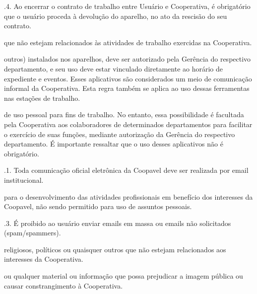 \documentclass[letterpaper,10pt,portuges]{sphinxmanual}
\begin{document}
.4. Ao encerrar o contrato de trabalho entre Usuário e Cooperativa, é obrigatório que o usuário proceda à devolução
do aparelho, no ato da rescisão do seu contrato.
\begin{description}
\sphinxAtStartPar
que não estejam relacionados às atividades de trabalho exercidas na Cooperativa.

\sphinxAtStartPar
outros) instalados nos aparelhos, deve ser autorizado pela Gerência do respectivo departamento, e seu uso deve estar
vinculado diretamente ao horário de expediente e eventos. Esses aplicativos são considerados um meio de comunicação
informal da Cooperativa. Esta regra também se aplica ao uso dessas ferramentas nas estações de trabalho.

\sphinxAtStartPar
de uso pessoal para fins de trabalho. No entanto, essa possibilidade é facultada pela Cooperativa aos colaboradores de determinados departamentos para facilitar o exercício de suas funções, mediante autorização da Gerência do respectivo departamento. É importante ressaltar que o uso desses aplicativos não é obrigatório.

\end{description}

.1. Toda comunicação oficial eletrônica da Coopavel deve ser realizada por e\sphinxhyphen{}mail institucional.
\begin{description}
\sphinxAtStartPar
para o desenvolvimento das atividades profissionais em benefício dos interesses da Coopavel, não sendo permitido
para uso de assuntos pessoais.

\end{description}

.3. É proibido ao usuário enviar e\sphinxhyphen{}mails em massa ou e\sphinxhyphen{}mails não solicitados (spam/spammers).
\begin{description}
\sphinxAtStartPar
religiosos, políticos ou quaisquer outros que não estejam relacionados aos interesses da Cooperativa.

\sphinxAtStartPar
ou qualquer material ou informação que possa prejudicar a imagem pública ou causar constrangimento à Cooperativa.

\end{description}
\end{document}
